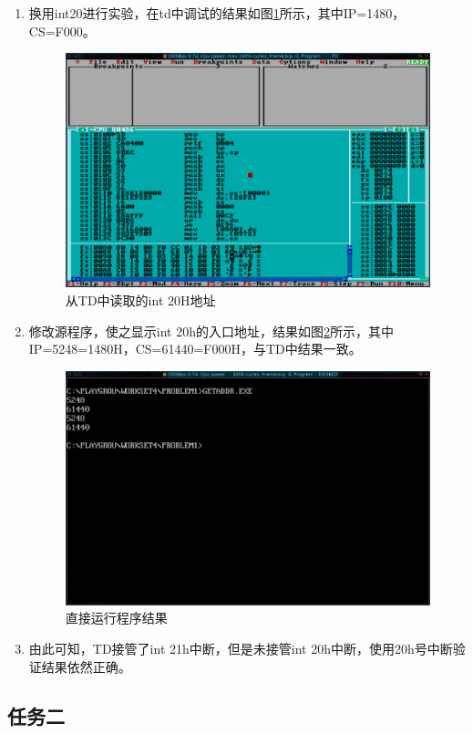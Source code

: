 \documentclass{article}
\begin{document}
\begin{enumerate}
		\item 换用int20进行实验，在td中调试的结果如图\ref{fig:int20address}所示，其中IP=1480，CS=F000。
			\begin{figure}[H]
				\centering
				\includegraphics[width=0.9\linewidth]{res/homework_4/int20address.png}
				\caption{从TD中读取的int 20H地址}
				\label{fig:int20address}
			\end{figure}

		\item 修改源程序，使之显示int 20h的入口地址，结果如图\ref{fig:runprog20}所示，其中IP=5248=1480H，CS=61440=F000H，与TD中结果一致。
			\begin{figure}[H]
				\centering
				\includegraphics[width=0.9\linewidth]{res/homework_4/runprog20.png}
				\caption{直接运行程序结果}
				\label{fig:runprog20}
			\end{figure}
		\item 由此可知，TD接管了int 21h中断，但是未接管int 20h中断，使用20h号中断验证结果依然正确。
	\end{enumerate}

	\subsection{任务二}
\end{document}
